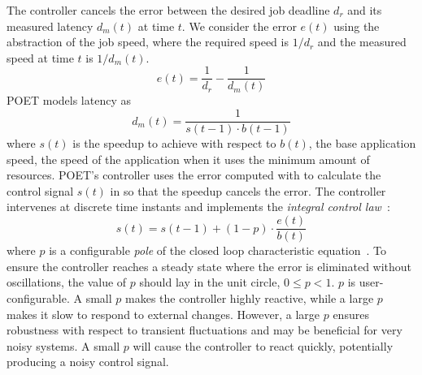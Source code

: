 The controller cancels the error between the desired job deadline $d_r$ and its measured latency $d_m(t)$ at time $t$.
We consider the error $e(t)$ using the abstraction of the job speed, where the required speed is $1/d_r$ and the measured speed at time $t$ is $1/d_m(t)$.
\begin{equation}
e(t) = \frac{1}{d_r} - \frac{1}{d_m(t)}
\label{eqn:poet-error}
\end{equation}
POET models latency as
\begin{equation}
d_m(t) = \frac{1}{s(t-1) \cdot b(t-1)}
\label{eqn:poet-latency}
\end{equation}
where $s(t)$ is the speedup to achieve with respect to $b(t)$, the base application speed, \ie the speed of the application when it uses the minimum amount of resources.
%
POET's controller uses the error computed with  to calculate the control signal $s(t)$ in  so that the speedup cancels the error.
The controller intervenes at discrete time instants and implements the \emph{integral control law}~\cite{Hellerstein2004a}:
\begin{equation}
  s(t) = s(t-1) + (1-p) \cdot \frac{e(t)}{b(t)} 
  \label{eqn:poet-control}
\end{equation}
where $p$ is a configurable \emph{pole} of the closed loop characteristic equation~\cite{ICSE2014}.
To ensure the controller reaches a steady state where the error is eliminated without oscillations, the value of $p$ should lay in the unit circle, \ie $0 \le p < 1$. $p$ is user-configurable.
A small $p$ makes the controller highly reactive, while a large $p$ makes it slow to respond to external changes.
However, a large $p$ ensures robustness with respect to transient fluctuations and may be beneficial for very noisy systems.
A small $p$ will cause the controller to react quickly, potentially producing a noisy control signal.

